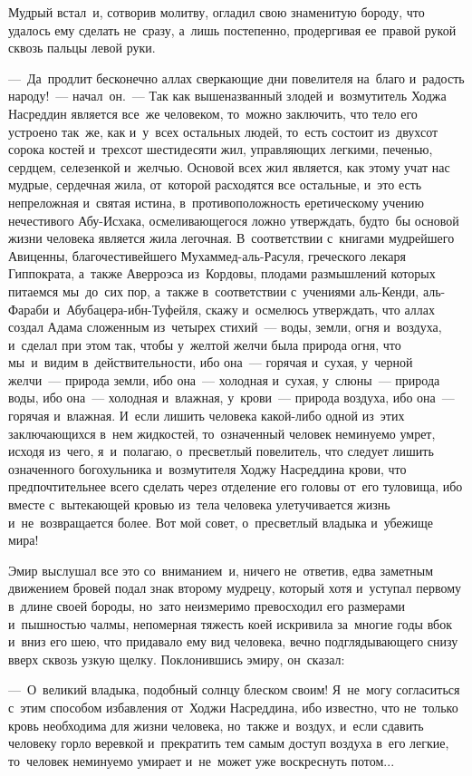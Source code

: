 \documentclass[12pt,a4paper]{book}
\begin{document}
Мудрый встал~и, сотворив молитву, огладил свою знаменитую бороду, что удалось ему сделать не~сразу, а~лишь постепенно, продергивая ее~правой рукой сквозь пальцы левой руки.

—~Да~продлит бесконечно аллах сверкающие дни повелителя на~благо и~радость народу!~— начал~он.~— Так как вышеназванный злодей и~возмутитель Ходжа Насреддин является все~же человеком, то~можно заключить, что тело его устроено так~же, как и~у~всех остальных людей, то~есть состоит из~двухсот сорока костей и~трехсот шестидесяти жил, управляющих легкими, печенью, сердцем, селезенкой и~желчью. Основой всех жил является, как этому учат нас мудрые, сердечная жила, от~которой расходятся все остальные, и~это есть непреложная и~святая истина, в~противоположность еретическому учению нечестивого Абу-Исхака, осмеливающегося ложно утверждать, будто~бы основой жизни человека является жила легочная. В~соответствии с~книгами мудрейшего Авиценны, благочестивейшего Мухаммед-аль-Расуля, греческого лекаря Гиппократа, а~также Аверроэса из~Кордовы, плодами размышлений которых питаемся мы~до~сих пор, а~также в~соответствии с~учениями аль-Кенди, аль-Фараби и~Абубацера-ибн-Туфейля, скажу и~осмелюсь утверждать, что аллах создал Адама сложенным из~четырех стихий~— воды, земли, огня и~воздуха, и~сделал при этом так, чтобы у~желтой желчи была природа огня, что мы~и~видим в~действительности, ибо она~— горячая и~сухая, у~черной желчи~— природа земли, ибо она~— холодная и~сухая, у~слюны~— природа воды, ибо она~— холодная и~влажная, у~крови~— природа воздуха, ибо она~— горячая и~влажная. И~если лишить человека какой-либо одной из~этих заключающихся в~нем жидкостей, то~означенный человек неминуемо умрет, исходя из~чего, я~и~полагаю, о~пресветлый повелитель, что следует лишить означенного богохульника и~возмутителя Ходжу Насреддина крови, что предпочтительнее всего сделать через отделение его головы от~его туловища, ибо вместе с~вытекающей кровью из~тела человека улетучивается жизнь и~не~возвращается более. Вот мой совет, о~пресветлый владыка и~убежище мира!

Эмир выслушал все это со~вниманием~и, ничего не~ответив, едва заметным движением бровей подал знак второму мудрецу, который хотя и~уступал первому в~длине своей бороды, но~зато неизмеримо превосходил его размерами и~пышностью чалмы, непомерная тяжесть коей искривила за~многие годы вбок и~вниз его шею, что придавало ему вид человека, вечно подглядывающего снизу вверх сквозь узкую щелку. Поклонившись эмиру, он~сказал:

—~О~великий владыка, подобный солнцу блеском своим! Я~не~могу согласиться с~этим способом избавления от~Ходжи Насреддина, ибо известно, что не~только кровь необходима для жизни человека, но~также и~воздух, и~если сдавить человеку горло веревкой и~прекратить тем самым доступ воздуха в~его легкие, то~человек неминуемо умирает и~не~может уже воскреснуть потом...
\end{document}
